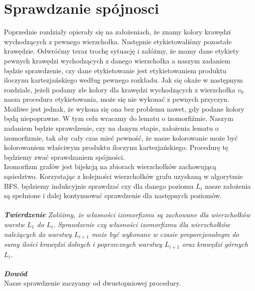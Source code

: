 \documentclass[12pt,a4paper,titlepage]{article}
\begin{document}
\section{Sprawdzanie spójnosci}
Poprzednie rozdziały opierały się na założeniach, że znamy kolory krawędzi wychodzących z pewnego wierzchołka. Następnie etykietowaliśmy pozostałe krawędzie. Odwróćmy teraz trochę sytuację i załóżmy, że mamy dane etykiety pewnych krawędzi wychodzących z danego wierzchołka a naszym zadaniem będzie sprawdzenie, czy dane etykietowanie jest etykietowaniem produktu iloczynu kartezjańskiego według pewnego rozkładu. Jak się okaże w następnym rozdziale, jeżeli podamy złe kolory dla krawędzi wychodzących z wierzchołka $v_0$ nasza procedura etykietowania, może się nie wykonać z pewnych przyczyn. Możliwe jest jednak, że wykona się ona bez problemu nawet, gdy podane kolory będą niepoprawne. W tym celu wracamy do lematu o izomorfiźmie. Naszym zadaniem będzie sprawdzenie, czy na danym etapie, założenia lematu o izomorfizmie, tak aby cały czas mieć pewność, że nasze kolorowanie może być kolorowaniem właściwym produktu iloczynu kartezjańskiego. Procedurę tę będziemy zwać sprawdzaniem spójności.\\
Izomorfizm grafów jest bijekcją na zbiorach wierzchołków zachowującą sąsiedztwo. Korzystając z kolejności wierzchołków grafu uzyskaną w algorytmie BFS, będziemy indukcyjnie sprawdzać czy dla danego poziomu $L_i$ nasze założenia są spełnione i dalej kontynuować sprawdzenie dla następnych poziomów. \\
\\
\textit{\textbf{Twierdzenie} Załóżmy, że własności izomorfizmu są zachowane dla wierzchołków warstw $L_1$ do $L_i$. Sprawdzenie czy własności izomorfizmu dla wierzchołków należących do warstwy $L_{i+1}$ może być wykonane w czasie proporcjonalnym do sumy ilości krawędzi dolnych i poprzecznych warstwy $L_{i+1}$ oraz krawędzi górnych $L_{i}$.} \\
\\
\textit{\textbf{Dowód}}\\
Nasze sprawdzenie zaczyamy od dwustopniowej procedury.\\
\end{document}

